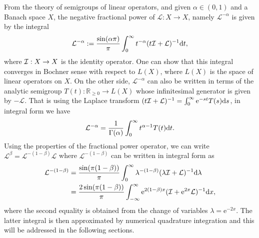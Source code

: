 From the theory of semigroups of linear operators, and given $\alpha \in (0,1)$ and a Banach space $X$, the negative fractional power of $\mathcal{L}: X \to X$, namely $\mathcal{L}^{-\alpha}$ is given by the integral\cite{pazi}
\begin{align*}
\mathcal{L}^{-\alpha} := \frac{\sin(\alpha\pi)}{\pi}\int_0^{\infty} t^{-\alpha}(t\mathcal{I}+\mathcal{L})^{-1}\text{d} t,
\end{align*}
where $\mathcal{I}:X\to X$ is the identity operator. One can show that this integral converges in Bochner sense with respect to $L(X)$, where $L(X)$ is the space of linear operators on $X$. On the other side, $\mathcal{L}^{-\alpha}$ can also be written in terms of the analytic semigroup $T(t):\mathbb{R}_{\ge0}\to L(X)$ whose infinitesimal generator is given by $-\mathcal{L}$. That is using the Laplace transform $(t\mathcal{I}+\mathcal{L})^{-1} = \int_0^{\infty}\text{e}^{-st}T(s)\text{d} s$, in integral form we have
\begin{align*}
\mathcal{L}^{-\alpha} = \frac{1}{\Gamma(\alpha)}\int_0^{\infty} t^{\alpha-1}T(t)\text{d} t.
\end{align*}
Using the properties of the fractional power operator, we can write $\mathcal{L}^{\beta} = \mathcal{L}^{-(1-\beta)}\mathcal{L}$ where $\mathcal{L}^{-(1-\beta)}$ can be written in integral form as
\begin{align*}
\mathcal{L}^{-(1-\beta)} &= \frac{\sin(\pi(1-\beta))}{\pi} \int_0^{\infty} \lambda^{-(1-\beta)}(\lambda \mathcal{I} + \mathcal{L})^{-1}\text{d}\lambda \\
& =\frac{2\sin(\pi(1-\beta))}{\pi} \int_{-\infty}^{\infty} \text{e}^{2(1-\beta) x}(\mathcal{I}+\text{e}^{2x}\mathcal{L})^{-1} \text{d} x,
\end{align*}
where the second equality is obtained from the change of variables $\lambda = \text{e}^{-2x}$. The latter integral is then approximated by numerical quadrature integration and this will be addressed in the following sections.  


